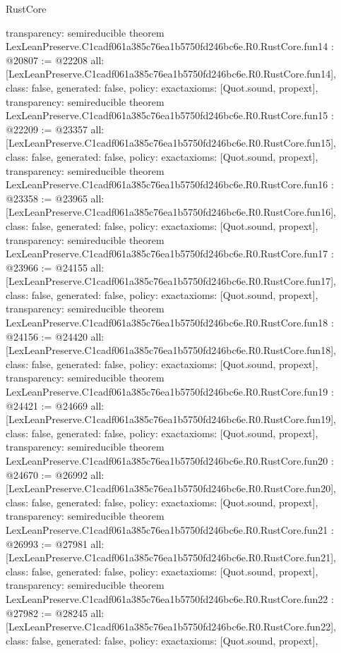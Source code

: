 \begin{lexlean}{RustCore}
\begin{coremodule}
{  transparency: semireducible
}
theorem LexLeanPreserve.C1cadf061a385c76ea1b5750fd246bc6e.R0.RustCore.fun14 : @20807 := @22208 {
  all: [LexLeanPreserve.C1cadf061a385c76ea1b5750fd246bc6e.R0.RustCore.fun14],
  class: false,
  generated: false,
  policy: exact{axioms: [Quot.sound, propext]},
  transparency: semireducible
}
theorem LexLeanPreserve.C1cadf061a385c76ea1b5750fd246bc6e.R0.RustCore.fun15 : @22209 := @23357 {
  all: [LexLeanPreserve.C1cadf061a385c76ea1b5750fd246bc6e.R0.RustCore.fun15],
  class: false,
  generated: false,
  policy: exact{axioms: [Quot.sound, propext]},
  transparency: semireducible
}
theorem LexLeanPreserve.C1cadf061a385c76ea1b5750fd246bc6e.R0.RustCore.fun16 : @23358 := @23965 {
  all: [LexLeanPreserve.C1cadf061a385c76ea1b5750fd246bc6e.R0.RustCore.fun16],
  class: false,
  generated: false,
  policy: exact{axioms: [Quot.sound, propext]},
  transparency: semireducible
}
theorem LexLeanPreserve.C1cadf061a385c76ea1b5750fd246bc6e.R0.RustCore.fun17 : @23966 := @24155 {
  all: [LexLeanPreserve.C1cadf061a385c76ea1b5750fd246bc6e.R0.RustCore.fun17],
  class: false,
  generated: false,
  policy: exact{axioms: [Quot.sound, propext]},
  transparency: semireducible
}
theorem LexLeanPreserve.C1cadf061a385c76ea1b5750fd246bc6e.R0.RustCore.fun18 : @24156 := @24420 {
  all: [LexLeanPreserve.C1cadf061a385c76ea1b5750fd246bc6e.R0.RustCore.fun18],
  class: false,
  generated: false,
  policy: exact{axioms: [Quot.sound, propext]},
  transparency: semireducible
}
theorem LexLeanPreserve.C1cadf061a385c76ea1b5750fd246bc6e.R0.RustCore.fun19 : @24421 := @24669 {
  all: [LexLeanPreserve.C1cadf061a385c76ea1b5750fd246bc6e.R0.RustCore.fun19],
  class: false,
  generated: false,
  policy: exact{axioms: [Quot.sound, propext]},
  transparency: semireducible
}
theorem LexLeanPreserve.C1cadf061a385c76ea1b5750fd246bc6e.R0.RustCore.fun20 : @24670 := @26992 {
  all: [LexLeanPreserve.C1cadf061a385c76ea1b5750fd246bc6e.R0.RustCore.fun20],
  class: false,
  generated: false,
  policy: exact{axioms: [Quot.sound, propext]},
  transparency: semireducible
}
theorem LexLeanPreserve.C1cadf061a385c76ea1b5750fd246bc6e.R0.RustCore.fun21 : @26993 := @27981 {
  all: [LexLeanPreserve.C1cadf061a385c76ea1b5750fd246bc6e.R0.RustCore.fun21],
  class: false,
  generated: false,
  policy: exact{axioms: [Quot.sound, propext]},
  transparency: semireducible
}
theorem LexLeanPreserve.C1cadf061a385c76ea1b5750fd246bc6e.R0.RustCore.fun22 : @27982 := @28245 {
  all: [LexLeanPreserve.C1cadf061a385c76ea1b5750fd246bc6e.R0.RustCore.fun22],
  class: false,
  generated: false,
  policy: exact{axioms: [Quot.sound, propext]},
}
\end{coremodule}
\end{lexlean}
